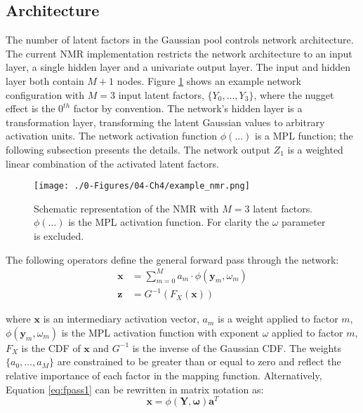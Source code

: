 \subsection{Architecture}
\label{subsec:04arch}

The number of latent factors in the Gaussian pool controls network architecture. The current \gls{NMR} implementation restricts the network architecture to an input layer, a single hidden layer and a univariate output layer. The input and hidden layer both contain $M+1$ nodes. Figure \ref{fig:example_nmr} shows an example network configuration with $M=3$ input latent factors, $\{ Y_{0}, \dots, Y_{3}\}$, where the nugget effect is the $0^{th}$ factor by convention. The network's hidden layer is a transformation layer, transforming the latent Gaussian values to arbitrary activation units. The network activation function $\phi(\dots)$ is a \gls{MPL} function; the following subsection presents the details. The network output $Z_{1}$ is a weighted linear combination of the activated latent factors.

\begin{figure}[htb!]
    \centering
    \texttt{[image: ./0-Figures/04-Ch4/example\_nmr.png]}
    \caption{Schematic representation of the \gls{NMR} with $M=3$ latent factors. $\phi(\dots)$ is the \gls{MPL} activation function. For clarity the $\omega$ parameter is excluded.}
    \label{fig:example_nmr}
\end{figure}

The following operators define the general forward pass through the network:
\begin{align}
    \label{eq:fpass1}
    \mathbf{x} & = \sum_{m=0}^{M}a_{m} \cdot \phi(\mathbf{y}_{m}, \omega_{m}) \\
    \label{eq:fpass2}
    \mathbf{z} & = G^{-1}\left( F_{X}\left(\mathbf{x} \right)\right)
\end{align}

\lowercase{Where} $\mathbf{x}$ is an intermediary activation vector, $a_{m}$ is a weight applied to factor $m$, $\phi(\mathbf{y}_{m}, \omega_{m})$ is the \gls{MPL} activation function with exponent $\omega$ applied to factor $m$, $F_{X}$ is the \gls{CDF} of $\mathbf{x}$ and $G^{-1}$ is the inverse of the Gaussian \gls{CDF}. The weights $\{ a_{0}, \dots, a_{M}\}$ are constrained to be greater than or equal to zero and reflect the relative importance of each factor in the mapping function. Alternatively, Equation \ref{eq:fpass1} can be rewritten in matrix notation as:
\begin{equation}
    \mathbf{x} = \phi\left( \mathbf{Y}, \boldsymbol{\omega} \right) \mathbf{a}^{T}
    \label{eq:fpass3}
\end{equation}

